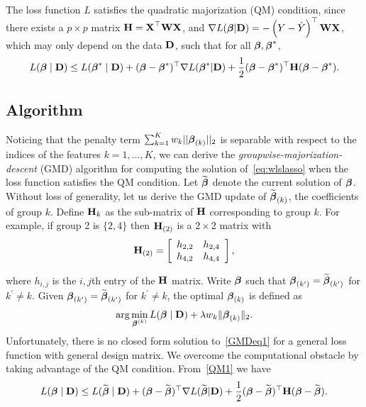 The loss function $L$ satisfies the quadratic majorization (QM) condition, since there exists
a $p\times p$ matrix $\textbf{H}=\textbf{X}^{\top}\mathbf{W}\textbf{X}$, and $\nabla L(\boldsymbol{\beta}|\textbf{D})=-\left(Y-\hat{Y}\right)^{\top}\mathbf{W}\textbf{X}$, which may only depend on the data $\textbf{D}$, such that for all $\boldsymbol{\beta},\boldsymbol{\beta}^{*}$,
\begin{equation}
L(\boldsymbol{\beta}\mid\textbf{D})\le L(\boldsymbol{\beta}^{*}\mid\textbf{D})+(\boldsymbol{\beta}-\boldsymbol{\beta}^{*})^{\top}\nabla L(\boldsymbol{\beta}^{*}|\textbf{D})+\frac{1}{2}(\boldsymbol{\beta}-\boldsymbol{\beta}^{*})^{\top}\textbf{H}(\boldsymbol{\beta}-\boldsymbol{\beta}^{*}).\label{QM1}
\end{equation}

\subsection{Algorithm}

Noticing that the penalty term $\sum_{k=1}^{K}w_{k}||\boldsymbol{\beta}_{(k)}||_{2}$ is separable with respect to the indices of the features $k=1, \ldots, K$, we can derive the \textit{groupwise-majorization-descent} (GMD) algorithm for computing the solution of~\eqref{eq:wlslasso} when the loss function satisfies the QM condition. Let $\widetilde{\boldsymbol{\beta}}$ denote the current solution of $\boldsymbol{\beta}$. Without loss of generality, let us derive the GMD update of $\widetilde{\boldsymbol{\beta}}_{(k)}$, the coefficients of group $k$. Define $\textbf{H}_{k}$ as the sub-matrix of $\textbf{H}$ corresponding to group $k$. For example, if group 2 is $\{2,4\}$ then $\textbf{H}_{(2)}$ is a $2\times2$ matrix with
\[
\textbf{H}_{(2)}=\left[\begin{array}{cc}
h_{2,2} & h_{2,4}\\
h_{4,2} & h_{4,4}
\end{array}\right],
\]

where $h_{i,j}$ is the $i,j$th entry of the $\textbf{H}$ matrix. Write $\boldsymbol{\beta}$ such that $\boldsymbol{\beta}_{(k^{\prime})}=\widetilde{\boldsymbol{\beta}}_{(k^{\prime})}$ for $k^{\prime}\ne k$. Given $\boldsymbol{\beta}_{(k^{\prime})}=\widetilde{\boldsymbol{\beta}}_{(k^{\prime})}$ for $k^{\prime}\ne k$, the optimal $\boldsymbol{\beta}_{(k)}$ is defined as
\begin{equation}
\arg\min_{\boldsymbol{\beta}^{(k)}}L(\boldsymbol{\beta}\mid\textbf{D})+\lambda w_{k}\Vert\boldsymbol{\beta}_{(k)}\Vert_{2}.\label{GMDeq1}
\end{equation}
Unfortunately, there is no closed form solution to~\eqref{GMDeq1} for a general loss function with general design matrix. We overcome the computational obstacle by taking advantage of the QM condition. From~\eqref{QM1} we have
\[
L(\boldsymbol{\beta}\mid\textbf{D})\le L(\widetilde{\boldsymbol{\beta}}\mid\textbf{D})+(\boldsymbol{\beta}-\widetilde{\boldsymbol{\beta}})^{\top}\nabla L(\widetilde{\boldsymbol{\beta}}|\textbf{D})+\frac{1}{2}(\boldsymbol{\beta}-\widetilde{\boldsymbol{\beta}})^{\top}\textbf{H}(\boldsymbol{\beta}-\widetilde{\boldsymbol{\beta}}).
\]

